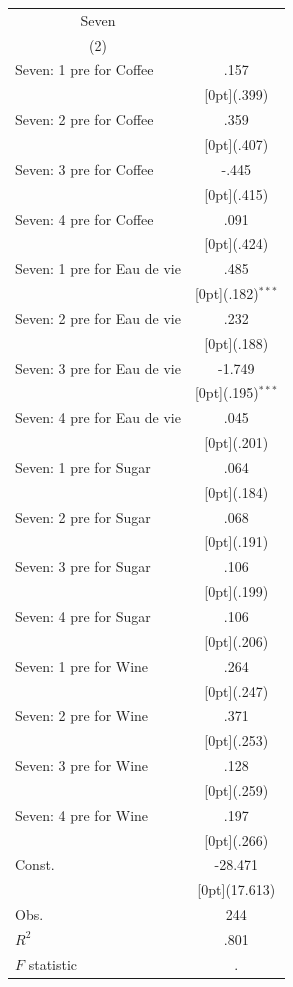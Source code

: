 \documentclass[12pt,a4paper,titlepage]{article}
\begin{document}
{\newpage
{}
\begin{tabular*}{\textwidth}{@{\extracolsep{\fill}}lc}	
	\multicolumn{1}{c}{Seven} \\
\cline{2-2}	
	\multicolumn{1}{c}{(2)} \\
\hline	
Seven: 1 pre for Coffee &	.157 \\
&	\raisebox{.7ex}[0pt]{\scriptsize (.399)} \\
Seven: 2 pre for Coffee &	.359 \\
&	\raisebox{.7ex}[0pt]{\scriptsize (.407)} \\
Seven: 3 pre for Coffee &	-.445 \\
&	\raisebox{.7ex}[0pt]{\scriptsize (.415)} \\
Seven: 4 pre for Coffee &	.091 \\
&	\raisebox{.7ex}[0pt]{\scriptsize (.424)} \\
Seven: 1 pre for Eau de vie &	.485 \\
&	\raisebox{.7ex}[0pt]{\scriptsize (.182)$^{***}$} \\
Seven: 2 pre for Eau de vie &	.232 \\
&	\raisebox{.7ex}[0pt]{\scriptsize (.188)} \\
Seven: 3 pre for Eau de vie &	-1.749 \\
&	\raisebox{.7ex}[0pt]{\scriptsize (.195)$^{***}$} \\
Seven: 4 pre for Eau de vie &	.045 \\
&	\raisebox{.7ex}[0pt]{\scriptsize (.201)} \\
Seven: 1 pre for Sugar &	.064 \\
&	\raisebox{.7ex}[0pt]{\scriptsize (.184)} \\
Seven: 2 pre for Sugar &	.068 \\
&	\raisebox{.7ex}[0pt]{\scriptsize (.191)} \\
Seven: 3 pre for Sugar &	.106 \\
&	\raisebox{.7ex}[0pt]{\scriptsize (.199)} \\
Seven: 4 pre for Sugar &	.106 \\
&	\raisebox{.7ex}[0pt]{\scriptsize (.206)} \\
Seven: 1 pre for Wine &	.264 \\
&	\raisebox{.7ex}[0pt]{\scriptsize (.247)} \\
Seven: 2 pre for Wine &	.371 \\
&	\raisebox{.7ex}[0pt]{\scriptsize (.253)} \\
Seven: 3 pre for Wine &	.128 \\
&	\raisebox{.7ex}[0pt]{\scriptsize (.259)} \\
Seven: 4 pre for Wine &	.197 \\
&	\raisebox{.7ex}[0pt]{\scriptsize (.266)} \\
Const. &	-28.471 \\
&	\raisebox{.7ex}[0pt]{\scriptsize (17.613)} \\
Obs. &	244 \\
$ R^2$ &	.801 \\
$ F$ statistic &	. \\
\hline\hline	
\end{tabular*}%

}
\end{document}
